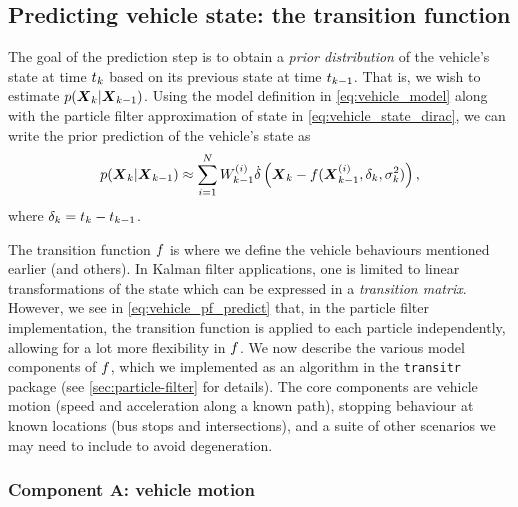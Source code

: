 \subsection{Predicting vehicle state: the transition function}
\label{sec:vehicle_model_trans}

The goal of the prediction step is to obtain a \emph{prior distribution} of the vehicle's state at time $t_k$ based on its previous state at time $t_{k-1}$. That is, we wish to estimate $p(\boldsymbol{X}_k | \boldsymbol{X}_{k-1})$. Using the model definition in \cref{eq:vehicle_model} along with the particle filter approximation of state in \cref{eq:vehicle_state_dirac}, we can write the prior prediction of the vehicle's state as
\begin{equation}
\label{eq:vehicle_pf_predict}
p(\boldsymbol{X}_k | \boldsymbol{X}_{k-1}) \approx
\sum_{i=1}^N
    W^{(i)}_{k-1}
    \dot\delta\left(\boldsymbol{X}_k - f(\boldsymbol{X}^{(i)}_{k-1}, \delta_k, \sigma^2_k)\right),
\end{equation}
where $\delta_k = t_k - t_{k-1}$.

The transition function $f$ is where we define the vehicle behaviours mentioned earlier (and others). In Kalman filter applications, one is limited to linear transformations of the state which can be expressed in a \emph{transition matrix}. However, we see in \cref{eq:vehicle_pf_predict} that, in the particle filter implementation, the transition function is applied to each particle independently, allowing for a lot more flexibility in $f$. We now describe the various model components of $f$, which we implemented as an algorithm in the \verb+transitr+ package (see \cref{sec:particle-filter} for details). The core components are vehicle motion (speed and acceleration along a known path), stopping behaviour at known locations (bus stops and intersections), and a suite of other scenarios we may need to include to avoid degeneration.


\subsubsection{Component A: vehicle motion}
\label{sec:vehicle_model_behaviour}

